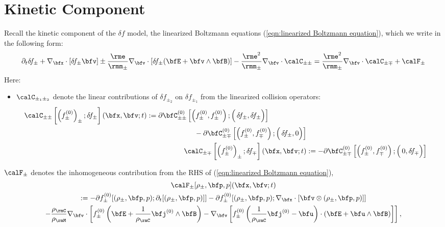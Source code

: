 \chapter{Kinetic Component}\label{cha:kinetic component}
    Recall the kinetic component of the $\delta\!f$ model, the linearized Boltzmann equations (\ref{eqn:linearized Boltzmann equation}), which we write in the following form:
    \begin{equation}\label{eqn:linearized Boltzmann equation simplified}
        \partial_{t}\delta\!f_{\pm} + \nabla_{\bfx}\cdot[\delta\!f_{\pm}\bfv] \pm \frac{\rme}{\rmm_{\pm}}\nabla_{\bfv}\cdot[\delta\!f_{\pm}(\bfE + \bfv\wedge\bfB)] - \frac{\rme^{2}}{\rmm_{\pm}}\nabla_{\bfv}\cdot\calC_{\pm\pm}  =  \frac{\rme^{2}}{\rmm_{\pm}}\nabla_{\bfv}\cdot\calC_{\pm\mp} + \calF_{\pm}
    \end{equation}
    Here:
    \begin{itemize}
        \item  $\calC_{\pm_{1}\pm_{2}}$ denote the linear contributions of $\delta\!f_{\pm_{2}}$ on $\delta\!f_{\pm_{1}}$ from the linearized collision operators:
        \begin{align}
            \begin{split}
                \calC_{\pm\pm}\left[\left(f_{\pm}^{(0)}\right)_{\pm}; \delta\!f_{\pm}\right](\bfx, \bfv; t)  &:=  \partial\bfC_{\pm\pm}^{(0)}\left[\left(f_{\pm}^{(0)}, f_{\pm}^{(0)}\right); \left({\color{white} f_{\pm}^{(0)}}\!\!\!\!\!\!\!\!\!\delta\!f_{\pm}, \delta\!f_{\pm}\right)\right]  \\
                &\;\;\;\;\;\;\;\;\;\;\;\;\;\;\;\;\;\;\;\;\;\;\;\;- \partial\bfC_{\pm\mp}^{(0)}\left[\left(f_{\pm}^{(0)}, f_{\mp}^{(0)}\right); \left({\color{white} f_{\pm}^{(0)}}\!\!\!\!\!\!\!\!\!\delta\!f_{\pm}, 0 \right)\right]
            \end{split}  \\
            \calC_{\pm\mp}\left[\left(f_{\pm}^{(0)}\right)_{\pm}; \delta\!f_{\mp}\right](\bfx, \bfv; t)  &:=   - \partial\bfC_{\pm\mp}^{(0)}\left[\left(f_{\pm}^{(0)}, f_{\mp}^{(0)}\right); \left({\color{white} f_{\pm}^{(0)}}\!\!\!\!\!\!\!\!\!0, \delta\!f_{\mp} \right)\right]
        \end{align}
        \end{itemize}
        \item  $\calF_{\pm}$ denotes the inhomogeneous contribution from the RHS of (\ref{eqn:linearized Boltzmann equation}),
        \begin{multline}
            \calF_{\pm}[\rho_{\pm}, \bfp, p](\bfx, \bfv; t)  \\
            :=  - \partial f_{\pm}^{(0)}[(\rho_{\pm}, \bfp, p); \partial_{t}[(\rho_{\pm}, \bfp, p)]] - \partial f_{\pm}^{(0)}[(\rho_{\pm}, \bfp, p); \nabla_{\bfx}\cdot[\bfv\otimes(\rho_{\pm}, \bfp, p)]]  \\
            - \frac{\rho_{\rmC}}{\rho_{\rmM}}\nabla_{\bfv}\cdot\left[f_{\pm}^{(0)}\left(\bfE + \frac{1}{\rho_{\rmC}}\bfj^{(0)}\wedge\bfB\right) - \nabla_{\bfv}\left[f_{\pm}^{(0)}\left(\frac{1}{\rho_{\rmC}}\bfj^{(0)} - \bfu\right)\cdot\left(\bfE + \bfu\wedge\bfB\right)\right]\right],
        \end{multline}
